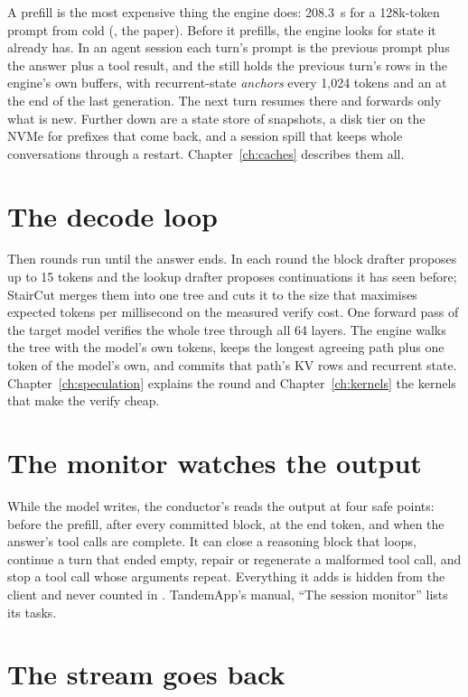 A prefill is the most expensive thing the engine does: 208.3~s for a 128k-token prompt from cold (\measured, the paper). Before it prefills, the engine looks for state it already has. In an agent session each turn's prompt is the previous prompt plus the answer plus a tool result, and the  still holds the previous turn's rows in the engine's own buffers, with recurrent-state \emph{anchors} every 1,024 tokens and an  at the end of the last generation. The next turn resumes there and forwards only what is new. Further down are a state store of snapshots, a disk tier on the NVMe for prefixes that come back, and a session spill that keeps whole conversations through a restart. Chapter~\ref{ch:caches} describes them all.

\section{The decode loop}

Then rounds run until the answer ends. In each round the block drafter proposes up to 15 tokens and the lookup drafter proposes continuations it has seen before; StairCut merges them into one tree and cuts it to the size that maximises expected tokens per millisecond on the measured verify cost. One forward pass of the target model verifies the whole tree through all 64 layers. The engine walks the tree with the model's own tokens, keeps the longest agreeing path plus one token of the model's own, and commits that path's KV rows and recurrent state. Chapter~\ref{ch:speculation} explains the round and Chapter~\ref{ch:kernels} the kernels that make the verify cheap.

\section{The monitor watches the output}

While the model writes, the conductor's  reads the output at four safe points: before the prefill, after every committed block, at the end token, and when the answer's tool calls are complete. It can close a reasoning block that loops, continue a turn that ended empty, repair or regenerate a malformed tool call, and stop a tool call whose arguments repeat. Everything it adds is hidden from the client and never counted in . TandemApp's manual, \enquote{The session monitor} lists its tasks.

\section{The stream goes back}

